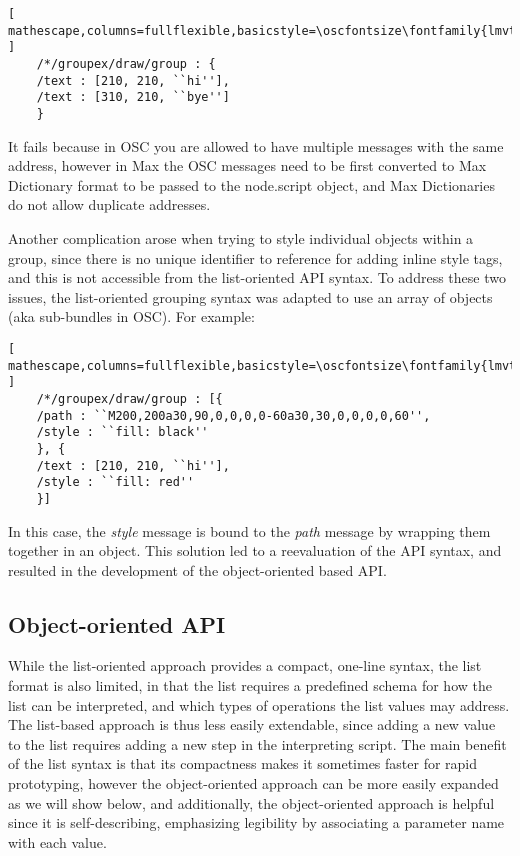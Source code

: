 \begin{lstlisting}[ mathescape,columns=fullflexible,basicstyle=\oscfontsize\fontfamily{lmvtt}\selectfont ]
    /*/groupex/draw/group : {
	/text : [210, 210, ``hi''],
	/text : [310, 210, ``bye'']
    }
\end{lstlisting}

\noindent
It fails because in OSC you are allowed to have multiple messages with the same address, however in Max the OSC messages need to be first converted to Max Dictionary format to be passed to the node.script object, and Max Dictionaries do not allow duplicate addresses.

Another complication arose when trying to style individual objects within a group, since there is no unique identifier to reference for adding inline style tags, and this is not accessible from the list-oriented API syntax. 
To address these two issues, the list-oriented grouping syntax was adapted to use an array of objects (aka sub-bundles in OSC). For example:
 
\begin{lstlisting}[ mathescape,columns=fullflexible,basicstyle=\oscfontsize\fontfamily{lmvtt}\selectfont ]
    /*/groupex/draw/group : [{
	/path : ``M200,200a30,90,0,0,0,0-60a30,30,0,0,0,0,60'',
	/style : ``fill: black''
    }, {
	/text : [210, 210, ``hi''],
	/style : ``fill: red''
    }]
\end{lstlisting}

\noindent
In this case, the \textit{style} message is bound to the \textit{path} message by wrapping them together in an object. 
This solution led to a reevaluation of the \drawsocket API syntax, and resulted in the development of the object-oriented based API.

\subsection{Object-oriented API}\label{sec:objstyle}
While the list-oriented approach provides a compact, one-line syntax, the list format is also limited, in that the list requires a predefined schema for how the list can be interpreted, and which types of operations the list values may address. 
The list-based approach is thus less easily extendable, since adding a new value to the list requires adding a new step in the interpreting script.
The main benefit of the list syntax is that its compactness makes it sometimes faster for rapid prototyping, however the object-oriented approach can be more easily expanded as we will show below, and additionally, the object-oriented approach is helpful since it is self-describing, emphasizing legibility by associating a parameter name with each value.

